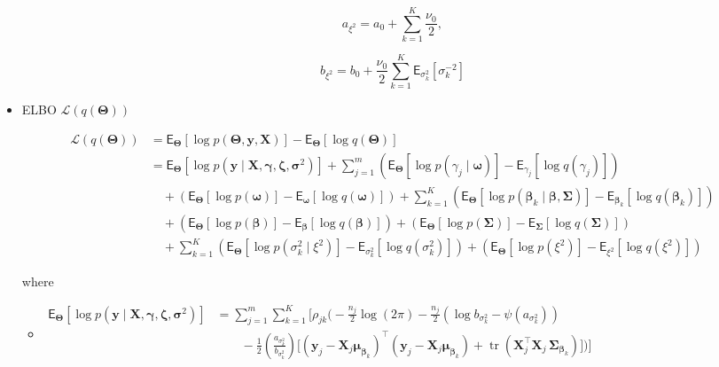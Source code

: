 \begin{itemize}
\begin{equation}
\label{CHLRM_CAVI_a_xi2}
a_{\xi^2}=  a_0 +\sum_{k=1}^{K}\frac{\nu_0}{2},
\end{equation}

\begin{equation}
\label{CHLRM_CAVI_b_xi2}
b_{\xi^2}= b_0 + \frac{\nu_0}{2} \sum_{k=1}^{K} \mathsf{E}_{\sigma^2_k}\left[\sigma_k^{-2}\right]
\end{equation}

\item ELBO $\mathcal{L}(q(\bm{\Theta}))$

\begin{equation}
\label{CHLRM_CAVI_ELBO}
\begin{split}
\mathcal{L}(q(\bm{\Theta}))
&=\mathsf{E}_{\bm{\Theta}}\left[\log p(\bm{\Theta},\bm{y}, \bm{X})\right]-\mathsf{E}_{\bm{\Theta}}\left[\log q(\bm{\Theta})\right]\\
&= \mathsf{E}_{\bm{\Theta}}\left[\log p(\bm{y}\mid\bm{X},\bm{\gamma},\bm{\zeta},\bm{\sigma}^2)\right] + \sum_{j=1}^{m}\left(\mathsf{E}_{\bm{\Theta}}\left[\log p(\gamma_j\mid\bm{\omega})\right] -\mathsf{E}_{\gamma_j}\left[\log q(\gamma_j)\right]\right) \\
&\quad + \left(\mathsf{E}_{\bm{\Theta}}\left[\log p(\bm{\omega})\right]- \mathsf{E}_{\bm{\omega}}\left[\log q(\bm{\omega})\right]\right)+ \sum_{k=1}^{K}\left(\mathsf{E}_{\bm{\Theta}}\left[\log p(\bm{\beta}_k\mid\bm{\beta},\bm{\Sigma})\right] -\mathsf{E}_{\bm{\beta}_k}\left[\log q(\bm{\beta}_k)\right]\right)\\
&\quad + \left(\mathsf{E}_{\bm{\Theta}}\left[\log p(\bm{\beta})\right]- \mathsf{E}_{\bm{\beta}}\left[\log q(\bm{\beta})\right]\right) + \left(\mathsf{E}_{\bm{\Theta}}\left[\log p(\bm{\Sigma})\right]-\mathsf{E}_{\bm{\Sigma}}\left[\log q(\bm{\Sigma})\right] \right)\\
&\quad + \sum_{k=1}^{K}\left(\mathsf{E}_{\bm{\Theta}}\left[\log p(\sigma_k^2 \mid \xi^2)\right]-\mathsf{E}_{\sigma_k^2}\!\left[\log q(\sigma_k^2)\right]\right) + \left(\mathsf{E}_{\bm{\Theta}}\left[\log p(\xi^2)\right]- \mathsf{E}_{\xi^2}\!\left[\log q(\xi^2)\right]\right) 
\end{split}
\end{equation}

where

\begin{itemize}
    \item 
    $
    \begin{aligned}
       \mathsf{E}_{\bm{\Theta}}\left[\log p(\bm{y}\mid\bm{X},\bm{\gamma},\bm{\zeta},\bm{\sigma}^2)\right]&=\sum_{j=1}^{m}\sum_{k=1}^{K}\Bigg[\rho_{jk}\Bigg(
-\tfrac{n_j}{2}\log(2\pi)
-\tfrac{n_j}{2}\left(\log b_{\sigma_k^2}-\psi(a_{\sigma_k^2})\right) \\
&\qquad
-\tfrac{1}{2}\left(\tfrac{a_{\sigma_k^2}}{b_{\sigma_k^2}}\right)
\Big[
(\bm{y}_j-\mathbf{X}_j\bm{\mu}_{\bm{\beta}_k})^\top(\bm{y}_j-\mathbf{X}_j\bm{\mu}_{\bm{\beta}_k})
+\operatorname{tr}\left(\mathbf{X}_j^\top\mathbf{X}_j\,\bm{\Sigma}_{\bm{\beta}_k}\right)
\Big]
\Bigg)\Bigg] \\ 
    \end{aligned}
    $


\end{itemize}
\end{itemize}
